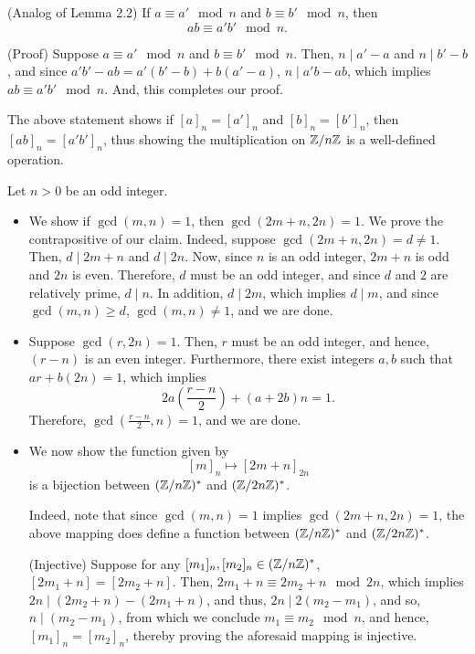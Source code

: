 \begin{xca}
(Analog of Lemma 2.2) If $a \equiv a' \mod n$ and $b \equiv b' \mod n$, then
\[ ab \equiv a'b' \mod n. \]

(Proof) Suppose $a \equiv a' \mod n$ and $b \equiv b' \mod n$. Then, $n \mid
a' - a$ and $n \mid b' - b$, and since $a'b' - ab = a'(b' - b) + b(a' - a)$,
$n \mid a'b - ab$, which implies $ab \equiv a'b' \mod n$. And, this completes
our proof.

The above statement shows if $[a]_n = [a']_n$ and $[b]_n = [b']_n$, then
$[ab]_n = [a'b']_n$, thus showing the multiplication on $\mathbb{Z}/{n\mathbb{Z}}$ is a
well-defined operation.
\end{xca}

\begin{xca}
Let $n > 0$ be an odd integer.
\begin{itemize}
\item We show if $\gcd(m, n) = 1$, then $\gcd(2m + n, 2n) = 1$. We prove the
contrapositive of our claim. Indeed, suppose $\gcd(2m + n, 2n) = d \ne 1$. Then,
$d \mid 2m + n$ and $d \mid 2n$. Now, since $n$ is an odd integer, $2m + n$ is
odd and $2n$ is even. Therefore, $d$ must be an odd integer, and since $d$ and
$2$ are relatively prime, $d \mid n$. In addition, $d \mid 2m$, which implies
$d \mid m$, and since $\gcd(m, n) \ge d$, $\gcd(m, n) \ne 1$, and we are done.

\item Suppose $\gcd(r, 2n) = 1$. Then, $r$ must be an odd integer, and hence,
$(r - n)$ is an even integer. Furthermore, there exist integers $a, b$ such that
$ar + b(2n) = 1$, which implies \[ 2a\left(\frac{r - n}{2}\right) + (a + 2b)n =
1. \] Therefore, $\gcd(\frac{r - n}{2}, n) = 1$, and we are done.

\item We now show the function given by \[ [m]_n \mapsto [2m + n]_{2n} \] is a
bijection between $(\mathbb{Z}/{n\mathbb{Z}})^*$ and $(\mathbb{Z}/{2n\mathbb{Z}})^*$.

Indeed, note that since $\gcd(m, n) = 1$ implies $\gcd(2m + n, 2n) = 1$, the
above mapping does define a function between $(\mathbb{Z}/{n\mathbb{Z}})^*$ and $(\mathbb{Z}/{2n\mathbb{Z}})^*$.

(Injective) Suppose for any $[m_1]_n, [m_2]_n \in (\mathbb{Z}/{n\mathbb{Z}})^*$, $[2m_1 + n] =
[2m_2 + n]$. Then, $2m_1 + n \equiv 2m_2 + n \mod 2n$, which implies $2n \mid
(2m_2 + n) - (2m_1 + n)$, and thus, $2n \mid 2(m_2 - m_1)$, and so, $n \mid
(m_2 - m_1)$, from which we conclude $m_1 \equiv m_2 \mod n$, and hence,
$[m_1]_n = [m_2]_n$, thereby proving the aforesaid mapping is injective.


\end{itemize}
\end{xca}

